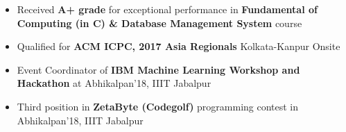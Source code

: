 
\begin{itemize}
	\item Received \textbf{A+ grade} for exceptional performance in \textbf {Fundamental of Computing (in C) \& Database Management System } course
	\item Qualified for \textbf{ACM ICPC, 2017 Asia Regionals} Kolkata-Kanpur Onsite
    \item Event Coordinator of \textbf{IBM Machine Learning Workshop and Hackathon} at Abhikalpan'18, IIIT Jabalpur
    \item Third position in \textbf{ZetaByte (Codegolf)} programming contest in Abhikalpan'18, IIIT Jabalpur
\end{itemize}
\medskip